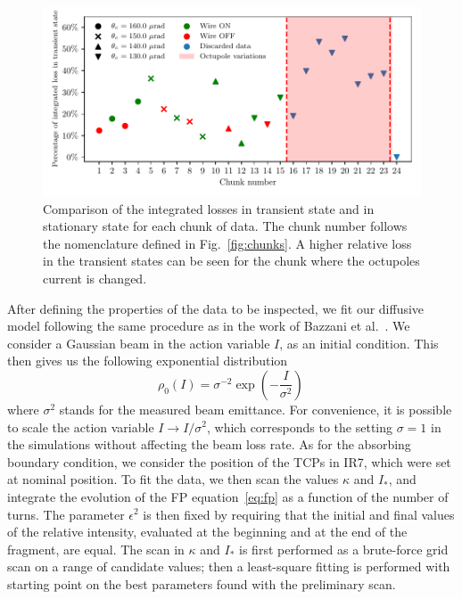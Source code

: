 \begin{figure}[th]
    \centering
    \includegraphics[width=1.0\textwidth]{5_wire_compensators_LHC/figs/losses_comparison.pdf}
    \caption{Comparison of the integrated losses in transient state and in stationary state for each chunk of data. The chunk number follows the nomenclature defined in Fig.~\ref{fig:chunks}. A higher relative loss in the transient states can be seen for the chunk where the octupoles current is changed.}
    \label{fig:wire_loss_comp}
\end{figure}

After defining the properties of the data to be inspected, we fit our diffusive model following the same procedure as in the work of Bazzani et al.~\cite{bazzani2020diffusion}. We consider a Gaussian beam in the action variable $I$, as an initial condition. This then gives us the following exponential distribution
\begin{equation}
    \rho_0(I) = \sigma^{-2}\exp\left(-\frac{I}{\sigma^2}\right)\,
\end{equation}
where $\sigma^2$ stands for the measured beam emittance. For convenience, it is possible to scale the action variable $I\to I/\sigma^2$, which corresponds to the setting $\sigma=1$ in the simulations without affecting the beam loss rate. As for the absorbing boundary condition, we consider the position of the TCPs in IR7, which were set at nominal position. To fit the data, we then scan the values $\kappa$ and $I_\ast$, and integrate the evolution of the FP equation~\eqref{eq:fp} as a function of the number of turns. The parameter $\epsilon^2$ is then fixed by requiring that the initial and final values of the relative intensity, evaluated at the beginning and at the end of the fragment, are equal. The scan in $\kappa$ and $I_\ast$ is first performed as a brute-force grid scan on a range of candidate values; then a least-square fitting is performed with starting point on the best parameters found with the preliminary scan.


